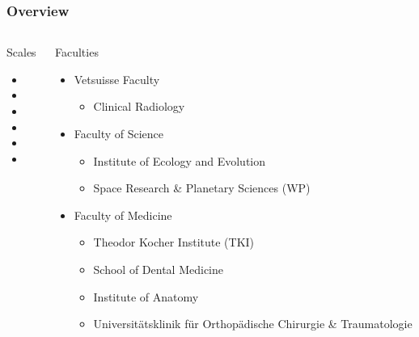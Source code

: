 \documentclass[aspectratio=169]{beamer}
\begin{document}
\begin{frame}
	\frametitle{Overview}
	\begin{columns}
		\begin{column}{0.309\linewidth}
			Scales
			\begin{itemize}
				\item {}%
				\normalsize\item\huge{}
				\normalsize\item\huge{}
                			\normalsize\item\huge{}%
				\normalsize\item\huge{}
				\normalsize\item\huge{}
			\end{itemize}
		\end{column}
		\begin{column}{0.618\linewidth}
			Faculties
			\begin{itemize}
				\item Vetsuisse Faculty
				\begin{itemize}
				    \item Clinical Radiology
				\end{itemize}
				\item Faculty of Science
				\begin{itemize}
					\item Institute of Ecology and Evolution
					\item Space Research \& Planetary Sciences (WP)
				\end{itemize}	
				\item Faculty of Medicine
				\begin{itemize}
					\item Theodor Kocher Institute (TKI)
					\item School of Dental Medicine
					\item Institute of Anatomy
					\item Universitätsklinik für Orthopädische Chirurgie \& Traumatologie
				\end{itemize}
			\end{itemize}
		\end{column}
	\end{columns}
\end{frame}
\end{document}

